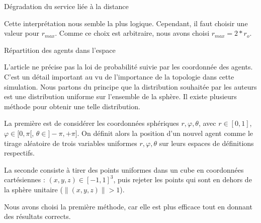 \documentclass{article}
\begin{document}
\begin{hypothese}{Dégradation du service liée à la distance}
\begin{center}
\end{center}

Cette interprétation nous semble la plus logique. Cependant, il faut choisir une valeur pour $r_{max}$. Comme ce choix est arbitraire, nous avons choisi $r_{max} = 2 * r_o$.\newline


\end{hypothese}

\begin{hypothese}{Répartition des agents dans l'espace}

L'article ne précise pas la loi de probabilité suivie par les coordonnée des agents. C'est un détail important au vu de l'importance de la topologie dans cette simulation. Nous partons du principe que la distribution souhaitée par les auteurs est une distribution uniforme sur l'ensemble de la sphère. Il existe plusieurs méthode pour obtenir une telle distribution.\newline

La première est de considérer les coordonnées sphériques $r, \varphi, \theta$, avec $r \in [0, 1]$, $\varphi \in [0, \pi[$, $\theta \in ]-\pi, +\pi]$. On définit alors la position d'un nouvel agent comme le tirage aléatoire de trois variables uniformes $r, \varphi, \theta$ sur leurs espaces de définitions respectifs.\newline

La seconde consiste à tirer des points uniformes dans un cube en coordonnées cartésiennes : $(x, y, z) \in [-1, 1]^3$, puis rejeter les points qui sont en dehors de la sphère unitaire ($\|(x, y, z)\| > 1$).\newline

Nous avons choisi la première méthode, car elle est plus efficace tout en donnant des résultats corrects.
\end{hypothese}
\vspace{10pt}
\end{document}
